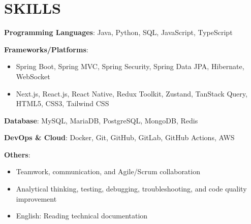 \section{SKILLS}
\resumeSubHeadingListStart

  \item
    \resumeItemListStart
      \item \textbf{Programming Languages}: Java, Python, SQL, JavaScript, TypeScript
      \item \textbf{Frameworks/Platforms}:
        \begin{itemize}
          \item Spring Boot, Spring MVC, Spring Security, Spring Data JPA, Hibernate, WebSocket
          \item Next.js, React.js, React Native, Redux Toolkit, Zustand, TanStack Query, HTML5, CSS3, Tailwind CSS
        \end{itemize}
      \item \textbf{Database}: MySQL, MariaDB, PostgreSQL, MongoDB, Redis
      \item \textbf{DevOps \& Cloud}: Docker, Git, GitHub, GitLab, GitHub Actions, AWS
      \item \textbf{Others}:
        \begin{itemize}
          \item Teamwork, communication, and Agile/Scrum collaboration
          \item Analytical thinking, testing, debugging, troubleshooting, and code quality improvement
          \item English: Reading technical documentation
        \end{itemize}
    \resumeItemListEnd

\resumeSubHeadingListEnd
